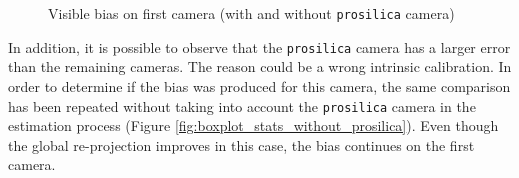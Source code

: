 \begin{figure}[!htbp]
 \centering
 \caption{Visible bias on first camera (with and without \texttt{prosilica} camera)}
\end{figure}

In addition, it is possible to observe that the \texttt{prosilica} camera has a larger error than the remaining cameras. The reason could be a wrong intrinsic calibration. In order to determine if the bias was produced for this camera, the same comparison has been repeated without taking into account the \texttt{prosilica} camera in the estimation process (Figure \ref{fig:boxplot_stats_without_prosilica}). Even though the global re-projection improves in this case, the bias continues on the first camera.




